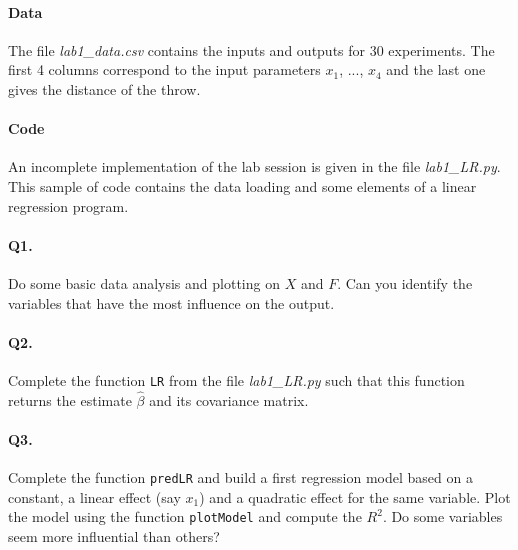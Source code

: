 \documentclass[12pt]{scrartcl}
\begin{document}
\paragraph{Data} The file \emph{lab1\_data.csv} contains the inputs and outputs for 30 experiments. The first 4 columns correspond to the input parameters $x_1$, ..., $x_4$ and the last one gives the distance of the throw.

\paragraph{Code} An incomplete implementation of the lab session is given in the file \emph{lab1\_LR.py}. This sample of code contains the data loading and some elements of a linear regression program.

\paragraph{Q1.} Do some basic data analysis and plotting on $X$ and $F$. Can you identify the variables that have the most influence on the output.

\paragraph{Q2.} Complete the function \texttt{LR} from the file \emph{lab1\_LR.py} such that this function returns the estimate $\hat{\beta}$ and its covariance matrix.

\paragraph{Q3.} Complete the function \texttt{predLR} and build a first regression model based on a constant, a linear effect (say $x_1$) and a quadratic effect for the same variable. Plot the model using the function \texttt{plotModel} and compute the $R^2$. Do some variables seem more influential than others?
\end{document}
